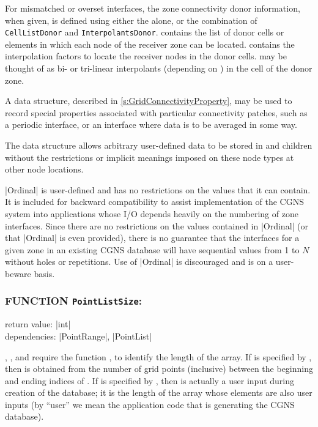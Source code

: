 For mismatched or overset interfaces, the zone connectivity
donor information, when given, is defined using either the
 alone, or the combination of \texttt{CellListDonor}
and \texttt{InterpolantsDonor}.
 contains the list of donor cells or elements in
which each node of the receiver zone can be located.
 contains the interpolation factors to locate
the receiver nodes in the donor cells.
 may be thought of as bi- or tri-linear
interpolants (depending on ) in the cell of the
donor zone.

A  data structure, described in
\autoref{s:GridConnectivityProperty}, may be used to record special
properties associated with particular connectivity patches, such as a
periodic interface, or an interface where data is to be averaged in some
way.

The  data structure allows arbitrary
user-defined data to be stored in  and
 children without the restrictions or implicit
meanings imposed on these node types at other node locations.

|Ordinal| is user-defined and has no restrictions on the values that it can
contain.  It is included for backward compatibility to assist implementation
of the CGNS system into applications whose I/O depends heavily on the
numbering of zone interfaces.  Since there are no restrictions on the values
contained in |Ordinal| (or that |Ordinal| is even provided), there is no
guarantee that the interfaces for a given zone in an existing CGNS database
will have sequential values from 1 to $N$ without holes or repetitions.  Use
of |Ordinal| is discouraged and is on a user-beware basis.

\subsubsection*{FUNCTION \texttt{PointListSize}:}

\noindent return value: |int| \\
\noindent dependencies: |PointRange|, |PointList|

, , and 
require the function , to identify the length of the
array.
If  is specified by ,
then  is obtained from the number of grid points
(inclusive) between the beginning and ending indices of .
If  is specified by ,
then  is actually a user input during creation of
the database; it is the length of the array  whose
elements are also user inputs (by ``user'' we mean the application code
that is generating the CGNS database).

